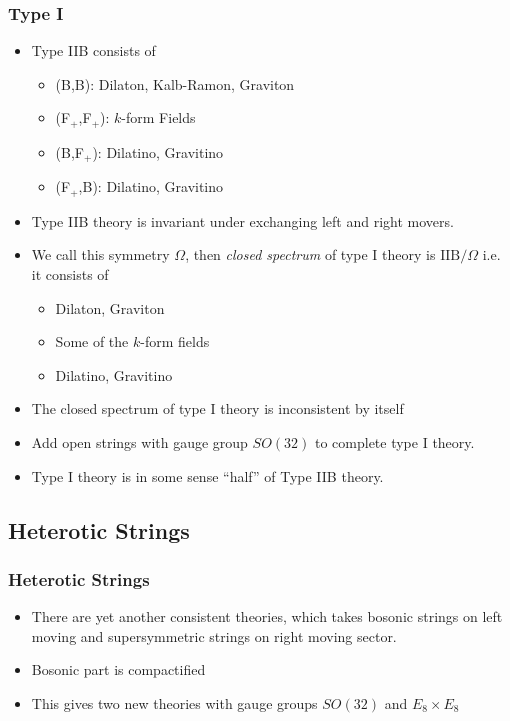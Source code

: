 \documentclass{beamer}
\begin{document}
\begin{frame}
  \frametitle{Type I}
  \begin{itemize}
  \item Type IIB consists of
    \begin{itemize}
    \item (B,B): Dilaton, Kalb-Ramon, Graviton
    \item (F$_{+}$,F$_{+}$): $k$-form Fields
    \item (B,F$_{+}$): Dilatino, Gravitino
    \item (F$_{+}$,B): Dilatino, Gravitino
    \end{itemize}  \item Type IIB theory is invariant under exchanging left and right movers. \pause
  \item We call this symmetry $\Omega$, then \emph{closed spectrum} of type I theory is $\text{IIB}/\Omega$ i.e. it consists of
    \begin{itemize}
    \item Dilaton, Graviton
    \item Some of the $k$-form fields
    \item Dilatino, Gravitino
    \end{itemize}
\item The closed spectrum of type I theory is inconsistent by itself
\item Add open strings with gauge group $SO(32)$ to complete type I theory.
\item Type I theory is in some sense ``half'' of Type IIB theory.
\end{itemize}
  
  
  
\end{frame}

\subsection{Heterotic Strings}



\begin{frame}
  \frametitle{Heterotic Strings}
  \begin{itemize}
  \item There are yet another consistent theories, which takes bosonic strings on left moving and supersymmetric strings on right moving sector.
  \item Bosonic part is compactified
  \item This gives two new theories with gauge groups $SO(32)$ and $E_{8} \times E_{8}$
  \end{itemize}
  
\end{frame}
\end{document}
